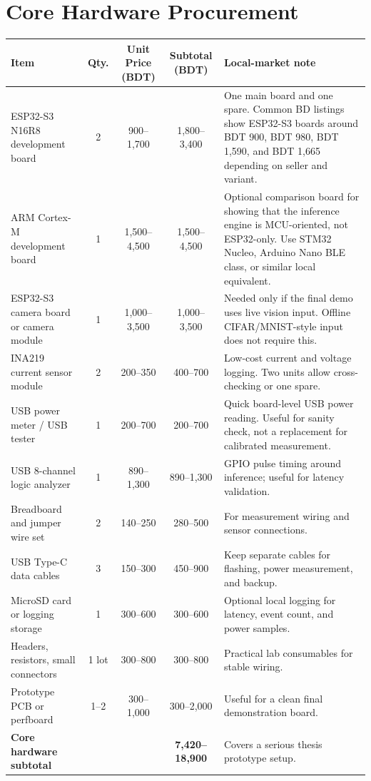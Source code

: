\documentclass[11pt]{article}
\begin{document}
\section*{Core Hardware Procurement}
\small
\begin{tabular}{p{4.1cm}cccp{4.9cm}}
\toprule
Item & Qty. & Unit Price (BDT) & Subtotal (BDT) & Local-market note \\
\midrule
ESP32-S3 N16R8 development board & 2 & 900--1,700 & 1,800--3,400 & One main board and one spare. Common BD listings show ESP32-S3 boards around BDT 900, BDT 980, BDT 1,590, and BDT 1,665 depending on seller and variant. \\
ARM Cortex-M development board & 1 & 1,500--4,500 & 1,500--4,500 & Optional comparison board for showing that the inference engine is MCU-oriented, not ESP32-only. Use STM32 Nucleo, Arduino Nano BLE class, or similar local equivalent. \\
ESP32-S3 camera board or camera module & 1 & 1,000--3,500 & 1,000--3,500 & Needed only if the final demo uses live vision input. Offline CIFAR/MNIST-style input does not require this. \\
INA219 current sensor module & 2 & 200--350 & 400--700 & Low-cost current and voltage logging. Two units allow cross-checking or one spare. \\
USB power meter / USB tester & 1 & 200--700 & 200--700 & Quick board-level USB power reading. Useful for sanity check, not a replacement for calibrated measurement. \\
USB 8-channel logic analyzer & 1 & 890--1,300 & 890--1,300 & GPIO pulse timing around inference; useful for latency validation. \\
Breadboard and jumper wire set & 2 & 140--250 & 280--500 & For measurement wiring and sensor connections. \\
USB Type-C data cables & 3 & 150--300 & 450--900 & Keep separate cables for flashing, power measurement, and backup. \\
MicroSD card or logging storage & 1 & 300--600 & 300--600 & Optional local logging for latency, event count, and power samples. \\
Headers, resistors, small connectors & 1 lot & 300--800 & 300--800 & Practical lab consumables for stable wiring. \\
Prototype PCB or perfboard & 1--2 & 300--1,000 & 300--2,000 & Useful for a clean final demonstration board. \\
\midrule
\textbf{Core hardware subtotal} & & & \textbf{7,420--18,900} & Covers a serious thesis prototype setup. \\
\bottomrule
\end{tabular}
\normalsize
\end{document}
